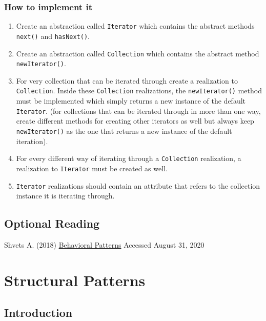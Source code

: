 \subsection{How to implement
it}\label{behavioral-patterns.md__how-to-implement-it-5}

\begin{enumerate}
\def\labelenumi{\arabic{enumi}.}
\tightlist
\item
  Create an abstraction called \texttt{Iterator} which contains the
  abstract methods \texttt{next()} and \texttt{hasNext()}.
\item
  Create an abstraction called \texttt{Collection} which contains the
  abstract method \texttt{newIterator()}.
\item
  For very collection that can be iterated through create a realization
  to \texttt{Collection}. Inside these \texttt{Collection} realizations,
  the \texttt{newIterator()} method must be implemented which simply
  returns a new instance of the default \texttt{Iterator}. (for
  collections that can be iterated through in more than one way, create
  different methods for creating other iterators as well but always keep
  \texttt{newIterator()} as the one that returns a new instance of the
  default iteration).
\item
  For every different way of iterating through a \texttt{Collection}
  realization, a realization to \texttt{Iterator} must be created as
  well.
\item
  \texttt{Iterator} realizations should contain an attribute that refers
  to the collection instance it is iterating through.
\end{enumerate}

\section{Optional
Reading}\label{behavioral-patterns.md__optional-reading}

Shvets A. (2018)
\href{https://sourcemaking.com/design_patterns/behavioral_patterns}{Behavioral
Patterns} Accessed August 31, 2020

\chapter{Structural
Patterns}\label{structural-patterns.md__structural-patterns}

\section{Introduction}\label{structural-patterns.md__introduction}

